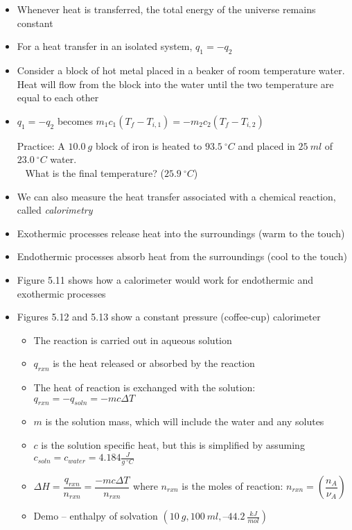 \documentclass[12pt, openany, letterpaper]{memoir}
\begin{document}
\begin{itemize}
  \item Whenever heat is transferred, the total energy of the universe remains constant
	\item For a heat transfer in an isolated system, $q_1=-q_2$
	\item Consider a block of hot metal placed in a beaker of room temperature water. Heat will flow from the block into the water until the two temperature are equal to each other
	\item $q_1=-q_2$ becomes $m_1c_1\left(T_f-T_{i,1}\right)=-m_2c_2\left(T_f-T_{i,2}\right)$

	      Practice: A $10.0~g$ block of iron is heated to $93.5~^\circ C$ and placed in $25~ml$ of $23.0~^\circ C$ water.\\
	      ~\hphantom{Practice:} What is the final temperature? ($25.9~^\circ C$)
	\item We can also measure the heat transfer associated with a chemical reaction, called \emph{calorimetry}
  \item Exothermic processes release heat into the surroundings (warm to the touch)
  \item Endothermic processes absorb heat from the surroundings (cool to the touch)
  \item Figure 5.11 shows how a calorimeter would work for endothermic and exothermic processes
  \item Figures 5.12 and 5.13 show a constant pressure (coffee-cup) calorimeter
    \begin{itemize}
      \item The reaction is carried out in aqueous solution
      \item $q_{rxn}$ is the heat released or absorbed by the reaction
      \item The heat of reaction is exchanged with the solution: $q_{rxn} = -q_{soln} = -mc\Delta T$
      \item $m$ is the solution mass, which will include the water and any solutes
      \item $c$ is the solution specific heat, but this is simplified by assuming $c_{soln}=c_{water}=4.184\frac{J}{g~^\circ C}$
      \item $\Delta H = \dfrac{q_{rxn}}{n_{rxn}} = \dfrac{-mc\Delta T}{n_{rxn}}$ where $n_{rxn}$ is the moles of reaction: $n_{rxn}=\left(\dfrac{n_A}{\nu_A}\right)$
      \item Demo --  enthalpy of solvation $\left(10~g, 100~ml, –44.2~\frac{kJ}{mol}\right)$

\end{itemize}
\end{itemize}
\end{document}
